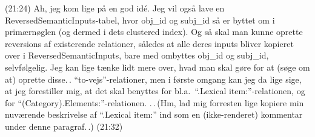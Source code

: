 \documentclass{report}
\begin{document}
(21:24) Ah, jeg kom lige på en god idé. Jeg vil også lave en ReversedSemanticInputs-tabel, hvor obj\_id og subj\_id så er byttet om i primærnøglen (og dermed i dets clustered index). Og så skal man kunne oprette reversions af existerende relationer, således at alle deres inputs bliver kopieret over i ReversedSemanticInputs, bare med ombyttes obj\_id og subj\_id, selvfølgelig. Jeg kan lige tænke lidt mere over, hvad man skal gøre for at (søge om at) oprette disse.\,. ``to-vejs''-relationer, men i første omgang kan jeg da lige sige, at jeg forestiller mig, at det skal benyttes for bl.a.\ ``.Lexical item:''-relationen, og for ``(Category).Elements:''-relationen. .\,.\,(Hm, lad mig forresten lige kopiere min nuværende beskrivelse af ``.Lexical item:'' ind som en (ikke-renderet) kommentar under denne paragraf.\,.) (21:32) 
\end{document}
